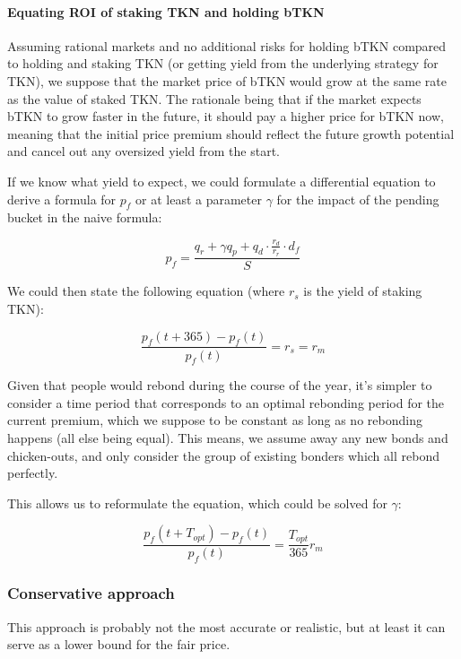\documentclass{article}
\begin{document}
\paragraph{Equating ROI of staking TKN and holding bTKN}
Assuming rational markets and no additional risks for holding bTKN compared to holding and staking TKN (or getting yield from the underlying strategy for TKN), we suppose that the market price of bTKN would grow at the same rate as the value of staked TKN. The rationale being that if the market expects bTKN to grow faster in the future, it should pay a higher price for bTKN now, meaning that the initial price premium should reflect the future growth potential and cancel out any oversized yield from the start.

If we know what yield to expect, we could formulate a differential equation to derive a formula for $p_f$ or at least a parameter $\gamma$ for the impact of the pending bucket in the naive formula:

\begin{equation}
  \label{eq:naive-beta}
   p_f = \frac{q_r + \gamma q_p + q_d \cdot \frac{r_d}{r_r} \cdot d_f}{S}
\end{equation}

We could then state the following equation (where $r_s$ is the yield of staking TKN):

\begin{equation}
  \label{eq:yield-eq}
  \frac{p_f(t + 365) - p_f(t)}{p_f(t)} = r_s = r_m 
\end{equation}

Given that people would rebond during the course of the year, it’s simpler to consider a time period that corresponds to an optimal rebonding period for the current premium, which we suppose to be constant as long as no rebonding happens (all else being equal). This means, we assume away any new bonds and chicken-outs, and only consider the group of existing bonders which all rebond perfectly.

This allows us to reformulate the equation, which could be solved for $\gamma$:

\begin{equation}
  \label{eq:yield-eq}
  \frac{p_f(t + T_{opt}) - p_f(t)}{p_f(t)} = \frac{T_{opt}}{365} r_m
\end{equation}

\subsubsection{Conservative approach}
This approach is probably not the most accurate or realistic, but at least it can serve as a lower bound for the fair price.
\end{document}
